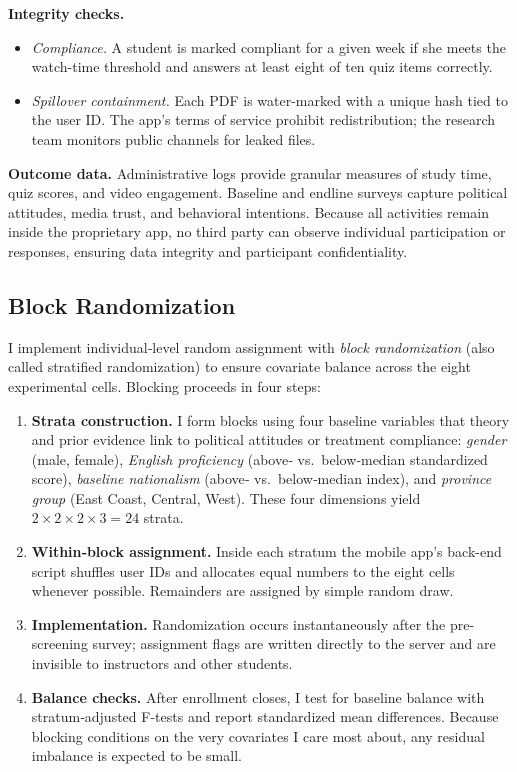 \documentclass[12pt, american]{article}
\begin{document}
\textbf{Integrity checks.}

\begin{itemize}
    \item \textit{Compliance.} A student is marked compliant for a given week if she meets the watch-time threshold and answers at least eight of ten quiz items correctly.  
    \item \textit{Spillover containment.} Each PDF is water-marked with a unique hash tied to the user ID.  The app’s terms of service prohibit redistribution; the research team monitors public channels for leaked files.
\end{itemize}

\textbf{Outcome data.}
Administrative logs provide granular measures of study time, quiz scores, and video engagement.  Baseline and endline surveys capture political attitudes, media trust, and behavioral intentions.  Because all activities remain inside the proprietary app, no third party can observe individual participation or responses, ensuring data integrity and participant confidentiality.




\subsection{Block Randomization}

I implement individual‐level random assignment with \emph{block randomization} (also called stratified randomization) to ensure covariate balance across the eight experimental cells.  Blocking proceeds in four steps:

\begin{enumerate}
    \item \textbf{Strata construction.}  I form blocks using four baseline variables that theory and prior evidence link to political attitudes or treatment compliance: \textit{gender} (male, female), \textit{English proficiency} (above‐ vs.\ below‐median standardized score), \textit{baseline nationalism} (above‐ vs.\ below‐median index), and \textit{province group} (East Coast, Central, West).  These four dimensions yield $2 \times 2 \times 2 \times 3 = 24$ strata.
    \item \textbf{Within‐block assignment.}  Inside each stratum the mobile app’s back-end script shuffles user IDs and allocates equal numbers to the eight cells whenever possible.  Remainders are assigned by simple random draw.
    \item \textbf{Implementation.}  Randomization occurs instantaneously after the pre-screening survey; assignment flags are written directly to the server and are invisible to instructors and other students.
    \item \textbf{Balance checks.}  After enrollment closes, I test for baseline balance with stratum‐adjusted F-tests and report standardized mean differences.  Because blocking conditions on the very covariates I care most about, any residual imbalance is expected to be small.
\end{enumerate}
\end{document}
